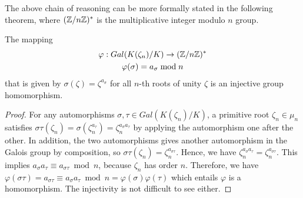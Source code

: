 \documentclass[../main.tex]{subfiles}
\begin{document}

The above chain of reasoning can be more formally stated in the following theorem, where $(\mathbb{Z}/n\mathbb{Z})^*$ is the multiplicative integer modulo $n$ group.
\begin{theorem}
\label{theorem:injective homomorphism from galois group}
The mapping 
\begin{gather*}
    \varphi: Gal(K(\zeta_n)/K) \rightarrow (\mathbb{Z}/n\mathbb{Z})^* \\
     \varphi(\sigma) = a_{\sigma} \bmod n 
\end{gather*}
that is given by $\sigma(\zeta) = \zeta^{a_{\sigma}}$ for all $n$-th roots of unity $\zeta$ is an injective group homomorphism.\reversemarginpar
{}
\end{theorem}

\begin{proof}
For any automorphisms $\sigma, \tau \in Gal(K(\zeta_n)/K)$, a primitive root $\zeta_n \in \mu_n$ satisfies $\sigma \tau(\zeta_n) = \sigma(\zeta_n^{a_{\tau}}) = \zeta_n^{a_{\sigma}a_{\tau}}$ by applying the automorphism one after the other. In addition, the two automorphisms gives another automorphism in the Galois group by composition, so $\sigma \tau(\zeta_n) = \zeta_n^{a_{\sigma \tau}}$. Hence, we have $\zeta_n^{a_{\sigma}a_{\tau}}=\zeta_n^{a_{\sigma \tau}}$. This implies $a_{\sigma}a_{\tau}\equiv a_{\sigma \tau} \bmod n$, because $\zeta_n$ has order $n$. Therefore, we have $\varphi(\sigma \tau) = a_{\sigma \tau} \equiv a_{\sigma}a_{\tau} \bmod n = \varphi(\sigma) \varphi(\tau)$ which entails $\varphi$ is a homomorphism. The injectivity is not difficult to see either. 
\end{proof}
\end{document}
